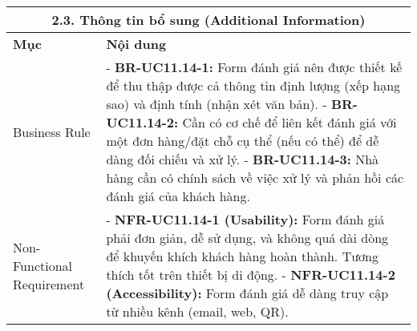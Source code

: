 \begin{longtable}{|m{4cm}|p{11cm}|}
\hline
\multicolumn{2}{|c|}{\textbf{2.3. Thông tin bổ sung (Additional Information)}} \\
\hline
\textbf{Mục} & \textbf{Nội dung} \\
\hline
Business Rule & - \textbf{BR-UC11.14-1:} Form đánh giá nên được thiết kế để thu thập được cả thông tin định lượng (xếp hạng sao) và định tính (nhận xét văn bản). \newline - \textbf{BR-UC11.14-2:} Cần có cơ chế để liên kết đánh giá với một đơn hàng/đặt chỗ cụ thể (nếu có thể) để dễ dàng đối chiếu và xử lý. \newline - \textbf{BR-UC11.14-3:} Nhà hàng cần có chính sách về việc xử lý và phản hồi các đánh giá của khách hàng. \\
\hline
Non-Functional Requirement & - \textbf{NFR-UC11.14-1 (Usability):} Form đánh giá phải đơn giản, dễ sử dụng, và không quá dài dòng để khuyến khích khách hàng hoàn thành. Tương thích tốt trên thiết bị di động. \newline - \textbf{NFR-UC11.14-2 (Accessibility):} Form đánh giá dễ dàng truy cập từ nhiều kênh (email, web, QR). \\
\hline
\end{longtable}


